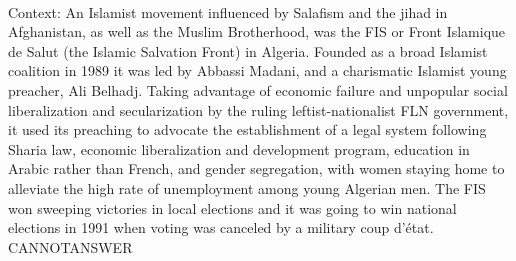 \documentclass[11pt,a4paper, onecolumn]{article}
\begin{document}
\\ Context: An Islamist movement influenced by Salafism and the jihad in Afghanistan, as well as the Muslim Brotherhood, was the FIS or Front Islamique de Salut (the Islamic Salvation Front) in Algeria. Founded as a broad Islamist coalition in 1989 it was led by Abbassi Madani, and a charismatic Islamist young preacher, Ali Belhadj. Taking advantage of economic failure and unpopular social liberalization and secularization by the ruling leftist-nationalist FLN government, it used its preaching to advocate the establishment of a legal system following Sharia law, economic liberalization and development program, education in Arabic rather than French, and gender segregation, with women staying home to alleviate the high rate of unemployment among young Algerian men. The FIS won sweeping victories in local elections and it was going to win national elections in 1991 when voting was canceled by a military coup d'état. CANNOTANSWER
\end{document}
